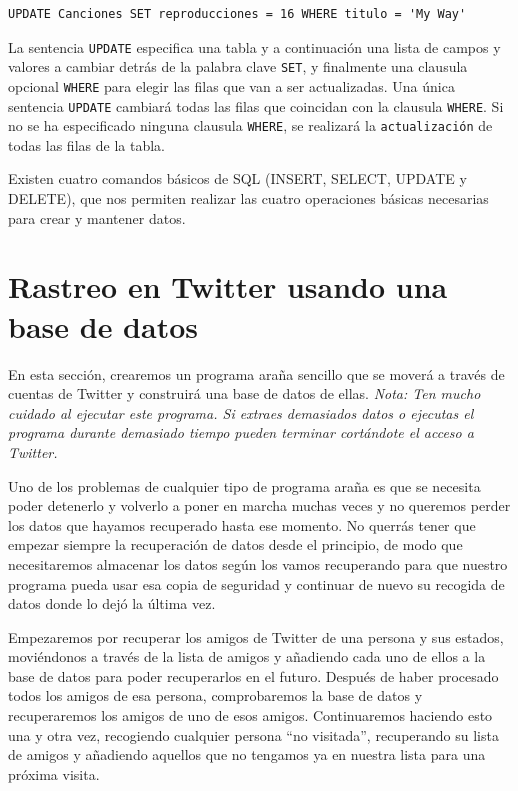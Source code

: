 \beforeverb
\begin{verbatim}
UPDATE Canciones SET reproducciones = 16 WHERE titulo = 'My Way'
\end{verbatim}
\afterverb
%
La sentencia {\tt UPDATE} especifica una tabla y a continuación
una lista de campos y valores a cambiar detrás de la palabra
clave {\tt SET}, y finalmente una clausula opcional {\tt WHERE} para elegir
las filas que van a ser actualizadas. Una única sentencia {\tt UPDATE}
cambiará todas las filas que coincidan con la clausula {\tt WHERE}.
Si no se ha especificado ninguna clausula {\tt WHERE}, se realizará la
{\tt actualización} de todas las filas de la tabla.

Existen cuatro comandos básicos de SQL (INSERT, SELECT, UPDATE y DELETE), que
nos permiten realizar las cuatro operaciones básicas necesarias para crear y mantener datos.

\section{Rastreo en Twitter usando una base de datos}

En esta sección, crearemos un programa araña sencillo que se moverá
a través de cuentas de Twitter y construirá una base de datos de ellas.
\emph{Nota: Ten mucho cuidado al ejecutar este programa. Si extraes
demasiados datos o ejecutas el programa durante demasiado tiempo
pueden terminar cortándote el acceso a Twitter.}

Uno de los problemas de cualquier tipo de programa araña es que se
necesita poder detenerlo y volverlo a poner en marcha muchas veces y
no queremos perder los datos que hayamos recuperado hasta ese momento.
No querrás tener que empezar siempre la recuperación de datos desde
el principio, de modo que necesitaremos almacenar los datos según los vamos recuperando para
que nuestro programa pueda usar esa copia de seguridad y continuar de nuevo su recogida de datos
donde lo dejó la última vez.

Empezaremos por recuperar los amigos de Twitter de una persona y sus estados,
moviéndonos a través de la lista de amigos y añadiendo cada uno de ellos
a la base de datos para poder recuperarlos en el futuro. Después
de haber procesado todos los amigos de esa persona, comprobaremos la base de datos
y recuperaremos los amigos de uno de esos amigos. Continuaremos haciendo esto una y otra vez,
recogiendo cualquier persona ``no visitada'', recuperando su lista de amigos
y añadiendo aquellos que no tengamos ya en nuestra lista para una próxima visita.

